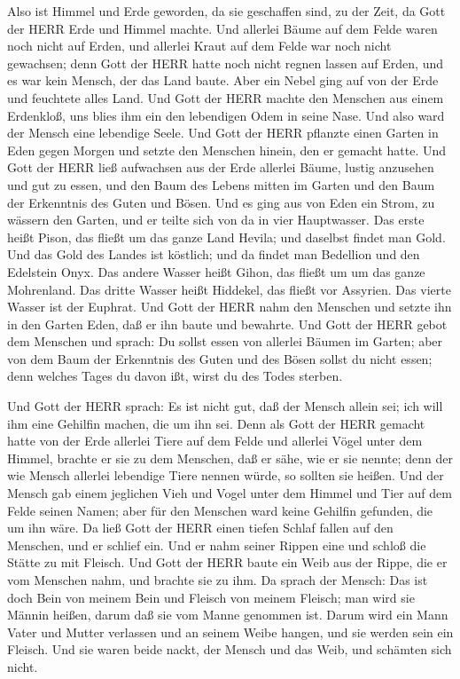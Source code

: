  Also ist Himmel und Erde geworden, da sie geschaffen sind,
zu der Zeit, da Gott der HERR Erde und Himmel machte.  Und
allerlei Bäume auf dem Felde waren noch nicht auf Erden, und allerlei
Kraut auf dem Felde war noch nicht gewachsen; denn Gott der HERR hatte
noch nicht regnen lassen auf Erden, und es war kein Mensch, der das Land
baute.  Aber ein Nebel ging auf von der Erde und feuchtete
alles Land.  Und Gott der HERR machte den Menschen aus einem
Erdenkloß, uns blies ihm ein den lebendigen Odem in seine Nase. Und also
ward der Mensch eine lebendige Seele.  Und Gott der HERR
pflanzte einen Garten in Eden gegen Morgen und setzte den Menschen
hinein, den er gemacht hatte.  Und Gott der HERR ließ
aufwachsen aus der Erde allerlei Bäume, lustig anzusehen und gut zu
essen, und den Baum des Lebens mitten im Garten und den Baum der
Erkenntnis des Guten und Bösen.  Und es ging aus von Eden
ein Strom, zu wässern den Garten, und er teilte sich von da in vier
Hauptwasser.  Das erste heißt Pison, das fließt um das
ganze Land Hevila; und daselbst findet man Gold.  Und das
Gold des Landes ist köstlich; und da findet man Bedellion und den
Edelstein Onyx.  Das andere Wasser heißt Gihon, das fließt
um um das ganze Mohrenland.  Das dritte Wasser heißt
Hiddekel, das fließt vor Assyrien. Das vierte Wasser ist der Euphrat.
 Und Gott der HERR nahm den Menschen und setzte ihn in den
Garten Eden, daß er ihn baute und bewahrte.  Und Gott der
HERR gebot dem Menschen und sprach: Du sollst essen von allerlei Bäumen
im Garten;  aber von dem Baum der Erkenntnis des Guten und
des Bösen sollst du nicht essen; denn welches Tages du davon ißt, wirst
du des Todes sterben.

 Und Gott der HERR sprach: Es ist nicht gut, daß der Mensch
allein sei; ich will ihm eine Gehilfin machen, die um ihn sei.
 Denn als Gott der HERR gemacht hatte von der Erde allerlei
Tiere auf dem Felde und allerlei Vögel unter dem Himmel, brachte er sie
zu dem Menschen, daß er sähe, wie er sie nennte; denn der wie Mensch
allerlei lebendige Tiere nennen würde, so sollten sie heißen.
 Und der Mensch gab einem jeglichen Vieh und Vogel unter
dem Himmel und Tier auf dem Felde seinen Namen; aber für den Menschen
ward keine Gehilfin gefunden, die um ihn wäre.  Da ließ
Gott der HERR einen tiefen Schlaf fallen auf den Menschen, und er
schlief ein. Und er nahm seiner Rippen eine und schloß die Stätte zu mit
Fleisch.  Und Gott der HERR baute ein Weib aus der Rippe,
die er vom Menschen nahm, und brachte sie zu ihm.  Da
sprach der Mensch: Das ist doch Bein von meinem Bein und Fleisch von
meinem Fleisch; man wird sie Männin heißen, darum daß sie vom Manne
genommen ist.  Darum wird ein Mann Vater und Mutter
verlassen und an seinem Weibe hangen, und sie werden sein ein Fleisch.
 Und sie waren beide nackt, der Mensch und das Weib, und
schämten sich nicht.

